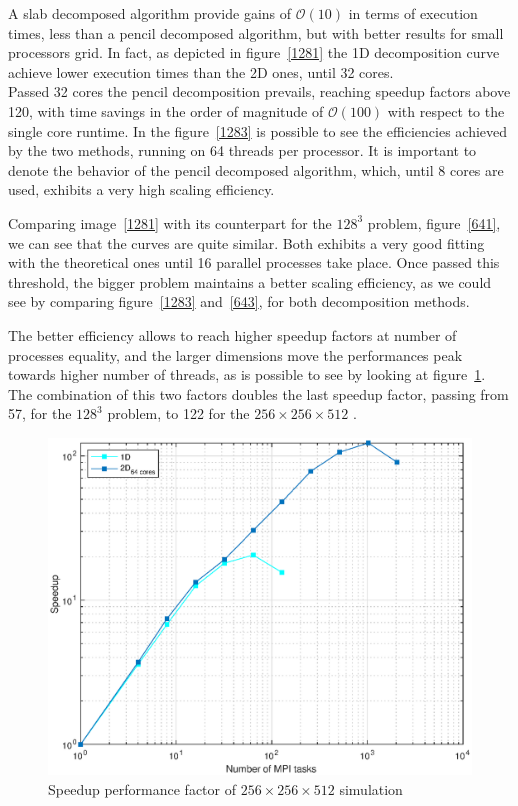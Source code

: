 A slab decomposed algorithm provide gains of $\mathcal{O}(10)$ in terms of execution times, less than a pencil decomposed algorithm, but with better results for small processors grid. In fact, as depicted in figure~\ref{1281} the 1D decomposition curve achieve lower execution times than the 2D ones, until 32 cores.\\
Passed 32 cores the pencil decomposition prevails, reaching speedup factors above 120, with time savings in the order of magnitude of $\mathcal{O}(100)$ with respect to the single core runtime.
In the figure~\ref{1283} is possible to see the efficiencies achieved by the two methods, running on 64 threads per processor. It is important to denote the behavior of the pencil decomposed algorithm, which, until 8 cores are used, exhibits a very high scaling efficiency. 
\par
Comparing image~\ref{1281} with its counterpart for the $128^{3}$ problem, figure~\ref{641}, we can see that the curves are quite similar. Both exhibits a very good fitting with the theoretical ones until 16 parallel processes take place. Once passed this threshold, the bigger problem maintains a better scaling efficiency, as we could see by comparing figure~\ref{1283} and~\ref{643}, for both decomposition methods. \par
The better efficiency allows to reach higher speedup factors at number of processes equality, and the larger dimensions move the performances peak towards higher number of threads, as is possible to see by looking at figure~\ref{1282}. The combination of this two factors doubles the last speedup factor, passing from 57, for the $128^{3}$ problem, to 122 for the $256\times 256\times 512$ .

\begin{figure}
\begin{center}
\includegraphics[scale=0.55]{grafici/1282}
\caption{Speedup performance factor of $256\times 256\times 512$  simulation}
\label{1282}
\end{center}
\end{figure}

